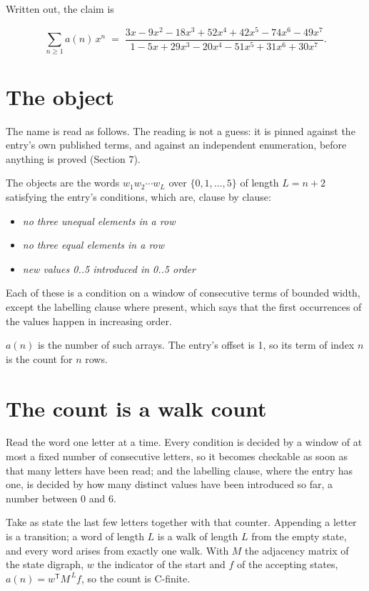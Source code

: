 \documentclass[11pt]{article}
\theoremstyle{definition}
\begin{document}
Written out, the claim is

\[\sum_{n \ge 1} a(n)\,x^n \;=\; \frac{3x - 9x^{2} - 18x^{3} + 52x^{4} + 42x^{5} - 74x^{6} - 49x^{7}}{1 - 5x + 29x^{3} - 20x^{4} - 51x^{5} + 31x^{6} + 30x^{7}}.\]

\section{The object}

The name is read as follows. The reading is not a guess: it is pinned against the entry's own published terms, and against an independent enumeration, before anything is proved (Section 7).

The objects are the words $w_1 w_2 \cdots w_L$ over $\{0,1,\dots,5\}$ of length $L = n + 2$ satisfying the entry's conditions, which are, clause by clause:

\begin{itemize}

\item {\itshape no three unequal elements in a row}

\item {\itshape no three equal elements in a row}

\item {\itshape new values 0..5 introduced in 0..5 order}

\end{itemize}

Each of these is a condition on a window of consecutive terms of bounded width, except the labelling clause where present, which says that the first occurrences of the values happen in increasing order.

$a(n)$ is the number of such arrays. The entry's offset is 1, so its term of index $n$ is the count for $n$ rows.

\section{The count is a walk count}

Read the word one letter at a time. Every condition is decided by a window of at most a fixed number of consecutive letters, so it becomes checkable as soon as that many letters have been read; and the labelling clause, where the entry has one, is decided by how many distinct values have been introduced so far, a number between $0$ and 6.

Take as state the last few letters together with that counter. Appending a letter is a transition; a word of length $L$ is a walk of length $L$ from the empty state, and every word arises from exactly one walk. With $M$ the adjacency matrix of the state digraph, $w$ the indicator of the start and $f$ of the accepting states, $a(n) = w^{\mathsf T}M^{\,L}f$, so the count is C-finite.
\end{document}
